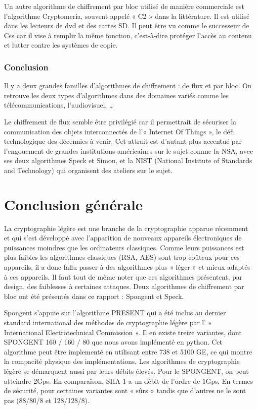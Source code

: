 Un autre algorithme de chiffrement par bloc utilisé de manière commerciale est
l'algorithme Cryptomeria, souvent appelé « C2 » dans la littérature. Il est
utilisé dans les lecteurs de dvd et des cartes SD. Il peut être vu comme le
successeur de Css car il vise à remplir la même fonction, c'est-à-dire
protéger l'accès au contenu et lutter contre les systèmes de copie.
\section{Conclusion}

Il y a deux grandes familles d'algorithmes de chiffrement : de flux et par
bloc. On retrouve les deux types d'algorithmes dans des domaines variés comme
les télécommunications, l'audiovisuel, \dots

Le chiffrement de flux semble être privilégié car il permettrait de sécuriser
la communication des objets interconnectés de l'« Internet Of Things », le
défi technologique des décennies à venir. Cet attrait est d'autant plus
accentué par l'engouement de grandes institutions américaines sur le sujet
comme la NSA, avec ses deux algorithmes Speck et Simon, et la NIST (National
Institute of Standards and Technology) qui organisent des ateliers sur le
sujet.

\newpage
\part*{Conclusion générale}

La cryptographie légère est une branche de la cryptographie apparue récemment
et qui s'est développé avec l'apparition de nouveaux appareils électroniques de
puissances moindres que les ordinateurs classiques. Comme leurs puissances est
plus faibles les algorithmes classiques (RSA, AES) sont trop coûteux pour ces
appareils, il a donc fallu passer à des algorithmes plus « léger » et mieux
adaptés à ces appareils. Il faut tout de même noter que ces algorithmes
présentent, par design, des faiblesses à certaines attaques. Deux algorithmes de
chiffrement par bloc ont été présentés dans ce rapport : Spongent et Speck.

Spongent s'appuie sur l'algorithme PRESENT qui a été inclus au dernier standard
international des méthodes de cryptographie légère par l’ « International
Electrotechnical Commission ». Il en existe treize variantes, dont SPONGENT 160 /
160 / 80 que nous avons implémenté en python. Cet algorithme peut être
implementé en utilisant entre 738 et 5100 GE, ce qui montre la compacité
physique des implémentations. Les algorithmes de cryptographie légère se
démarquent aussi par leurs débits élevés. Pour le SPONGENT, on peut atteindre
2Gps. En comparaison, SHA-1 a un débit de l'ordre de 1Gps. En termes de
sécurité, pour certaines variantes sont « sûrs » tandis que d'autres ne le sont
pas (88/80/8 et 128/128/8).

